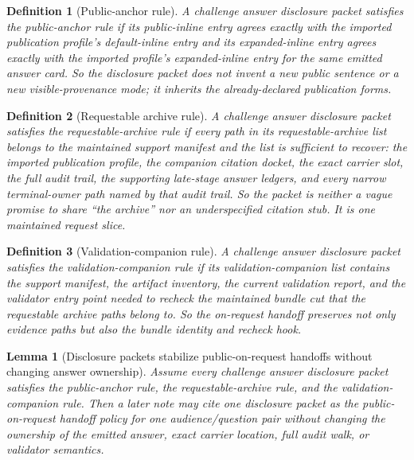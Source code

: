 \documentclass[11pt]{article}
\newtheorem{definition}{Definition}
\newtheorem{lemma}{Lemma}
\begin{document}
\begin{definition}[Public-anchor rule]
A challenge answer disclosure packet satisfies the \emph{public-anchor rule} if its public-inline entry agrees exactly with the imported publication profile's default-inline entry and its expanded-inline entry agrees exactly with the imported profile's expanded-inline entry for the same emitted answer card.
So the disclosure packet does not invent a new public sentence or a new visible-provenance mode; it inherits the already-declared publication forms.
\end{definition}

\begin{definition}[Requestable archive rule]
A challenge answer disclosure packet satisfies the \emph{requestable-archive rule} if every path in its requestable-archive list belongs to the maintained support manifest and the list is sufficient to recover: the imported publication profile, the companion citation docket, the exact carrier slot, the full audit trail, the supporting late-stage answer ledgers, and every narrow terminal-owner path named by that audit trail.
So the packet is neither a vague promise to share ``the archive'' nor an underspecified citation stub.
It is one maintained request slice.
\end{definition}

\begin{definition}[Validation-companion rule]
A challenge answer disclosure packet satisfies the \emph{validation-companion rule} if its validation-companion list contains the support manifest, the artifact inventory, the current validation report, and the validator entry point needed to recheck the maintained bundle cut that the requestable archive paths belong to.
So the on-request handoff preserves not only evidence paths but also the bundle identity and recheck hook.
\end{definition}

\begin{lemma}[Disclosure packets stabilize public-on-request handoffs without changing answer ownership]
Assume every challenge answer disclosure packet satisfies the public-anchor rule, the requestable-archive rule, and the validation-companion rule.
Then a later note may cite one disclosure packet as the public-on-request handoff policy for one audience/question pair without changing the ownership of the emitted answer, exact carrier location, full audit walk, or validator semantics.
\end{lemma}
\end{document}
